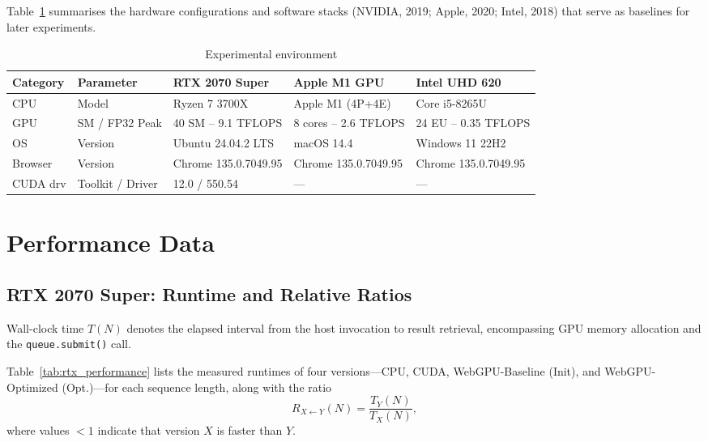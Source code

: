 \documentclass[PhD]{PHlab-thesis}
\begin{document}
Table~\ref{tab:exp_env} summarises the hardware configurations and software stacks (NVIDIA, 2019; Apple, 2020; Intel, 2018) that serve as baselines for later experiments.

\begin{table}[htbp]
  \centering
  \caption{Experimental environment}
  \label{tab:exp_env}
  \setlength{\tabcolsep}{8pt}
  \renewcommand{\arraystretch}{1.4}
  \small
  \begin{tabularx}{\textwidth}{@{}lX X X X@{}}
    \toprule
    Category & Parameter & RTX 2070 Super & Apple M1 GPU & Intel UHD 620 \\
    \midrule
    CPU      & Model                 & Ryzen 7 3700X          & Apple M1 (4P+4E) & Core i5-8265U \\
    GPU      & SM / FP32 Peak        & 40 SM – 9.1 TFLOPS     & 8 cores – 2.6 TFLOPS & 24 EU – 0.35 TFLOPS \\
    OS       & Version               & Ubuntu 24.04.2 LTS     & macOS 14.4          & Windows 11 22H2 \\
    Browser  & Version               & Chrome 135.0.7049.95  & Chrome 135.0.7049.95 & Chrome 135.0.7049.95 \\
    CUDA drv & Toolkit / Driver      & 12.0 / 550.54          & —                   & — \\
    \bottomrule
  \end{tabularx}
\end{table}

\section{Performance Data}

\subsection{RTX 2070 Super: Runtime and Relative Ratios}
Wall-clock time $T(N)$ denotes the elapsed interval from the host invocation to result retrieval, encompassing GPU memory allocation and the \texttt{queue.submit()} call.

Table~\ref{tab:rtx_performance} lists the measured runtimes of four versions—CPU, CUDA, WebGPU-Baseline (Init), and WebGPU-Optimized (Opt.)—for each sequence length, along with the ratio
\[
R_{X \leftarrow Y}(N)=\frac{T_Y(N)}{T_X(N)} ,
\]
where values $\!<\!1$ indicate that version $X$ is faster than $Y$.
\end{document}
